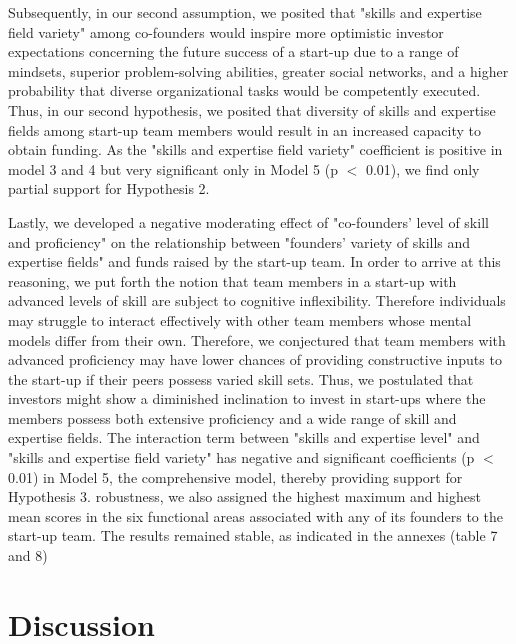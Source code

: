 \documentclass[12pt]{article}
\begin{document}
Subsequently, in our second assumption, we posited that "skills and expertise field variety" among co-founders would inspire more optimistic investor expectations concerning the future success of a start-up due to a range of mindsets, superior problem-solving abilities, greater social networks, and a higher probability that diverse organizational tasks would be competently executed. Thus, in our second hypothesis, we posited that diversity of skills and expertise fields among start-up team members would result in an increased capacity to obtain funding. As the "skills and expertise field variety" coefficient is positive in model 3 and 4 but very significant only in Model 5 (p $<$ 0.01), we find only partial support for Hypothesis 2.

Lastly, we developed a negative moderating effect of "co-founders’ level of skill and proficiency" on the relationship between "founders’ variety of skills and expertise fields" and funds raised by the start-up team. In order to arrive at this reasoning, we put forth the notion that team members in a start-up with advanced levels of skill are subject to cognitive inflexibility. Therefore individuals may struggle to interact effectively with other team members whose mental models differ from their own. Therefore, we conjectured that team members with advanced proficiency may have lower chances of providing constructive inputs to the start-up if their peers possess varied skill sets. Thus, we postulated that investors might show a diminished inclination to invest in start-ups where the members possess both extensive proficiency and a wide range of skill and expertise fields. The interaction term between "skills and expertise level" and "skills and expertise field variety" has negative and significant coefficients (p $<$ 0.01) in Model 5, the comprehensive model, thereby providing support for Hypothesis 3. robustness, we also assigned the highest maximum and highest mean scores in the six functional areas associated with any of its founders to the start-up team. The results remained stable, as indicated in the annexes (table 7 and 8)

\section{Discussion}
\end{document}
